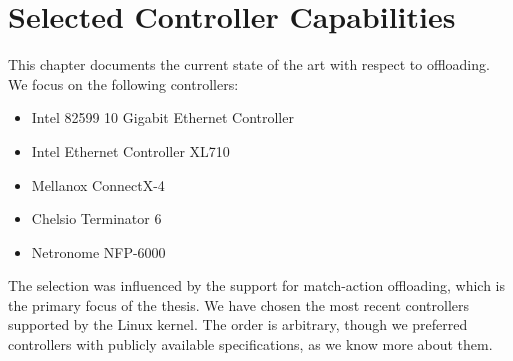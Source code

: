 \chapter{Selected Controller Capabilities}

This chapter documents the current state of the art with respect to offloading. We
focus on the following controllers:

\begin{itemize}
	\item Intel 82599 10 Gigabit Ethernet Controller
	\item Intel Ethernet Controller XL710
	\item Mellanox ConnectX-4
	\item Chelsio Terminator 6
	\item Netronome NFP-6000
\end{itemize}

The selection was influenced by the support for match-action offloading, which is the
primary focus of the thesis. We have chosen the most recent controllers
supported by the Linux kernel. The order is arbitrary, though we preferred
controllers with publicly available specifications, as we know more about them.


\newcommand{\sect}[1]{\todo{Fix the \textbackslash sect!}}








